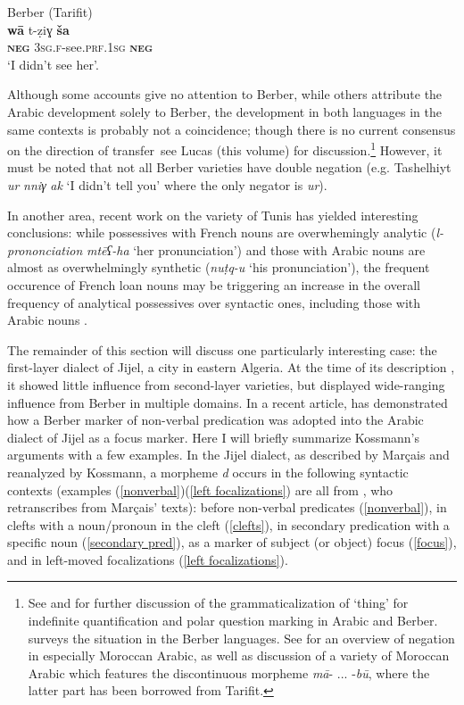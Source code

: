 \documentclass[output=paper]{langsci/langscibook}
\begin{document}
Berber (Tarifit)\\
\gll \textbf{wā}  t-ẓ{\R}iɣ  \textbf{ša}\\
     \textbf{\textsc{neg}}  \textsc{3sg.f}-see.\textsc{prf}.\textsc{1sg}  \textbf{\textsc{neg}}\\
\glt `I didn’t see her'.
\z

Although some accounts give no attention to Berber, while others attribute the Arabic development solely to Berber, the development in both languages in the same contexts is probably not a coincidence; though there is no current consensus on the direction of transfer \textendash \,see Lucas (this volume) for discussion.\footnote{See \citet{Lucas2007,Lucas2010,Lucas2018} and \citet{Souag2018thing} for further discussion of the grammaticalization of `thing’ for indefinite quantification and polar question marking in Arabic and Berber. \citet[324–334]{Kossmann2013book} surveys the situation in the Berber languages. See \citet{Lafkioui2013reinventing} for an overview of negation in especially Moroccan Arabic, as well as discussion of a variety of Moroccan Arabic which features the discontinuous morpheme \textit{mā}{}- ... -\textit{bū}, where the latter part has been borrowed from Tarifit.} However, it must be noted that not all Berber varieties have double negation (e.g. Tashelhiyt \textit{ur} \textit{nniγ} \textit{ak} ‘I didn’t tell you’ where the only negator is \textit{ur}).

  In another area, recent work on the variety of Tunis has yielded interesting conclusions: while possessives with French nouns are overwhemingly analytic (\textit{l-prononciation} \textit{mtēʕ-ha} ‘her pronunciation’) and those with Arabic nouns are almost as overwhelmingly synthetic (\textit{nuṭq-u} ‘his pronunciation’), the frequent occurence of French loan nouns may be triggering an increase in the overall frequency of analytical possessives over syntactic ones, including those with Arabic nouns \citep{Sayahi2015}.

  The remainder of this section will discuss one particularly interesting case: the first-layer dialect of Jijel, a city in eastern Algeria. At the time of its description \citep{Marçais1956}, it showed little influence from second-layer varieties, but displayed wide-ranging influence from Berber in multiple domains. In a recent article, \citet{Kossmann2014} has demonstrated how a Berber marker of non-verbal predication was adopted into the Arabic dialect of Jijel as a focus marker. Here I will briefly summarize Kossmann’s arguments with a few examples. In the Jijel dialect, as described by Marçais and reanalyzed by Kossmann, a morpheme \textit{d} occurs in the following syntactic contexts (examples (\ref{nonverbal})\textendash(\ref{left focalizations}) are all from \citealt[129]{Kossmann2014}, who retranscribes from Marçais’ texts): before non-verbal predicates (\ref{nonverbal}), in clefts with a noun/pronoun in the cleft (\ref{clefts}), in secondary predication with a specific noun (\ref{secondary pred}), as a marker of subject (or object) focus (\ref{focus}), and in left-moved focalizations (\ref{left focalizations}).
\end{document}
